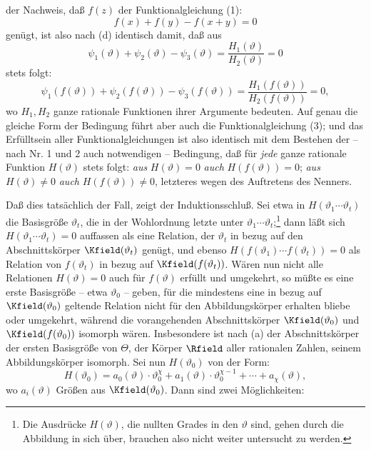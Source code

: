 der Nachweis, daß \(f(z)\) der Funktionalgleichung (1):
\[
f(x)+f(y)-f(x+y)=0
\]
genügt, ist also nach (d) identisch damit, daß aus
\[
\psi_1(\vartheta)+\psi_2(\vartheta)-\psi_3(\vartheta)
 =\frac{H_1(\vartheta)}{H_2(\vartheta)}=0
\]
stets folgt:
\[
\psi_1(f(\vartheta))+\psi_2(f(\vartheta))-\psi_3(f(\vartheta))
 =\frac{H_1(f(\vartheta))}{H_2(f(\vartheta))}=0,
\]
wo \(H_1,H_2\) ganze rationale Funktionen ihrer Argumente bedeuten. Auf genau die gleiche Form der Bedingung führt aber auch die Funktionalgleichung (3); und das Erfülltsein aller Funktionalgleichungen ist also identisch mit dem Bestehen der -- nach Nr. 1 und 2 auch notwendigen -- Bedingung, daß für \emph{jede} ganze rationale Funktion \(H(\vartheta)\) stets folgt: \emph{aus} \(H(\vartheta)=0\) \emph{auch} \(H(f(\vartheta))=0\); \emph{aus} \(H(\vartheta)\ne0\) \emph{auch} \(H(f(\vartheta))\ne0\), letzteres wegen des Auftretens des Nenners.

Daß dies tatsächlich der Fall, zeigt der Induktionsschluß. Sei etwa in \(H(\vartheta_1\cdots\vartheta_t)\) die Basisgröße \(\vartheta_t\), die in der Wohlordnung letzte unter \(\vartheta_1\cdots\vartheta_t\);\footnote{Die Ausdrücke \(H(\vartheta)\), die nullten Grades in den \(\vartheta\) sind, gehen durch die Abbildung in sich über, brauchen also nicht weiter untersucht zu werden.} dann läßt sich \(H(\vartheta_1\cdots\vartheta_t)=0\) auffassen als eine Relation, der \(\vartheta_t\) in bezug auf den Abschnittskörper \(\Kfield(\vartheta_t)\) genügt, und ebenso \(H(f(\vartheta_1)\cdots f(\vartheta_t))=0\) als Relation von \(f(\vartheta_t)\) in bezug auf \(\Kfield(f(\vartheta_t))\). Wären nun nicht alle Relationen \(H(\vartheta)=0\) auch für \(f(\vartheta)\) erfüllt und umgekehrt, so müßte es eine erste Basisgröße -- etwa \(\vartheta_0\) -- geben, für die mindestens eine in bezug auf \(\Kfield(\vartheta_0)\) geltende Relation nicht für den Abbildungskörper erhalten bliebe oder umgekehrt, während die vorangehenden Abschnittskörper \(\Kfield(\vartheta_0)\) und \(\Kfield(f(\vartheta_0))\) isomorph wären. Insbesondere ist nach (a) der Abschnittskörper der ersten Basisgröße von \(\Theta\), der Körper \(\Rfield\) aller rationalen Zahlen, seinem Abbildungskörper isomorph. Sei nun \(H(\vartheta_0)\) von der Form:
\[
H(\vartheta_0)=a_0(\vartheta)\cdot\vartheta_0^\chi
+a_1(\vartheta)\cdot\vartheta_0^{\chi-1}+\cdots+a_\chi(\vartheta),
\]
wo \(a_i(\vartheta)\) Größen aus \(\Kfield(\vartheta_0)\). Dann sind zwei Möglichkeiten:

